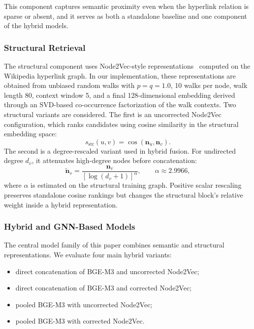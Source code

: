 \documentclass[runningheads]{llncs}
\begin{document}
This component captures semantic proximity even when the hyperlink relation is
sparse or absent, and it serves as both a standalone baseline and one component
of the hybrid models.

\subsubsection{Structural Retrieval}

The structural component uses Node2Vec-style representations~\cite{grover2016node2vec}
computed on the Wikipedia hyperlink graph. In our implementation, these
representations are obtained from unbiased random walks with $p=q=1.0$,
10 walks per node, walk length 80, context window 5, and a final 128-dimensional
embedding derived through an SVD-based co-occurrence factorization of the walk
contexts. Two structural variants are considered. The first is an uncorrected
Node2Vec configuration, which ranks candidates using cosine similarity in the
structural embedding space:
\begin{equation}
s_{\mathrm{str}}(u,v)=\cos(\mathbf{n}_u,\mathbf{n}_v).
\end{equation}
The second is a degree-rescaled variant used in hybrid fusion. For undirected
degree $d_v$, it attenuates high-degree nodes before concatenation:
\begin{equation}
\tilde{\mathbf{n}}_v=
\frac{\mathbf{n}_v}{[\log(d_v+1)]^{\alpha}},\qquad \alpha\approx2.9966,
\end{equation}
where $\alpha$ is estimated on the structural training graph. Positive scalar
rescaling preserves standalone cosine rankings but changes the structural
block's relative weight inside a hybrid representation.

\subsubsection{Hybrid and GNN-Based Models}

The central model family of this paper combines semantic and structural
representations. We evaluate four main hybrid variants:
\begin{itemize}
\item direct concatenation of BGE-M3 and uncorrected Node2Vec;
\item direct concatenation of BGE-M3 and corrected Node2Vec;
\item pooled BGE-M3 with uncorrected Node2Vec;
\item pooled BGE-M3 with corrected Node2Vec.
\end{itemize}
\end{document}
